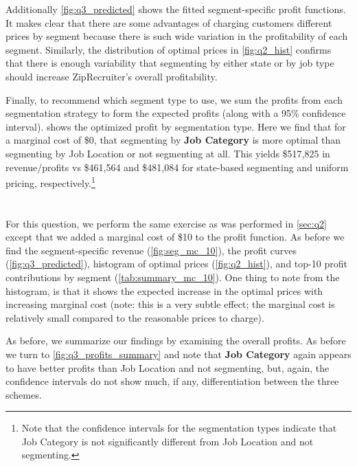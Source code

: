 Additionally \vref{fig:q3_predicted} shows the fitted segment-specific profit functions. It makes clear that there are some advantages of charging customers different prices by segment because there is such wide variation in the profitability of each segment.  Similarly, the distribution of optimal prices in \vref{fig:q2_hist} confirms that there is enough variability that segmenting by either state or by job type should increase ZipRecruiter's overall profitability.

Finally, to recommend which segment type to use, we sum the profits from each segmentation strategy to form the expected profits (along with a 95\% confidence interval).   shows the optimized profit by segmentation type.  Here we find that for a marginal cost of \$0, that segmenting by \textbf{Job Category} is more optimal than segmenting by Job Location or not segmenting at all.  This yields \$517,825 in revenue/profits vs \$461,564 and \$481,084 for state-based segmenting and uniform pricing, respectively.\footnote{Note that the confidence intervals for the segmentation types indicate that Job Category is not significantly different from Job Location and not segmenting.}




\section{} %
For this question, we perform the same exercise as was performed in \cref{sec:q2} except that we added a marginal cost of \$10 to the profit function.  As before we find the segment-specific revenue (\vref{fig:seg_mc_10}), the profit curves (\vref{fig:q3_predicted}), histogram of optimal prices (\vref{fig:q2_hist}), and top-10 profit contributions by segment (\vref{tab:summary_mc_10}).  One thing to note from the histogram, is that it shows the expected increase in the optimal prices with increasing marginal cost (note: this is a very subtle effect; the marginal cost is relatively small compared to the reasonable prices to charge).

As before, we summarize our findings by examining the overall profits.  As before we turn to \vref{fig:q3_profits_summary} and note that \textbf{Job Category} again appears to have better profits than Job Location and not segmenting, but, again, the confidence intervals do not show much, if any, differentiation between the three schemes.


